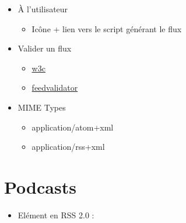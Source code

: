 \begin{itemize}
\tightlist
\item
  À l'utilisateur

  \begin{itemize}
  \tightlist
  \item
    Icône + lien vers le script générant le flux
  \end{itemize}

  \begin{english}

\begin{Shaded}
\begin{Highlighting}[]
\KeywordTok{\textgreater{}}
  
\end{Highlighting}
\end{Shaded}

  \end{english}
\item
  Valider un flux

  \begin{itemize}
  \tightlist
  \item
    \href{http://validator.w3.org/feed/}{w3c}
  \item
    \href{http://www.feedvalidator.org/}{feedvalidator}
  \end{itemize}
\item
  MIME Types

  \begin{itemize}
  \tightlist
  \item
    application/atom+xml
  \item
    application/rss+xml
  \end{itemize}
\end{itemize}

\hypertarget{podcasts}{%
\section{Podcasts}\label{podcasts}}

\begin{itemize}
\tightlist
\item
  Elément en RSS 2.0 :
\end{itemize}

